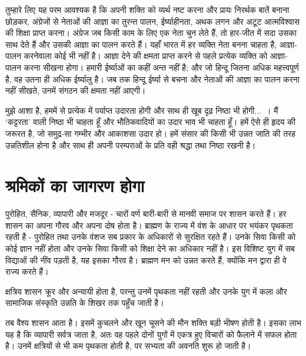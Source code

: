 तुम्हारे लिए यह परम आवश्यक है कि अपनी शक्ति को व्यर्थ नष्ट करना और प्रायः निरर्थक बातें बनाना छोड़कर, अंग्रेजों से नेताओं की आज्ञा का तुरन्त पालन, ईर्ष्याहीनता, अथक लगन और अटूट आत्मविश्वास की शिक्षा प्राप्त करना। अंग्रेज जब किसी काम के लिए एक नेता चुन लेते हैं, तो हार-जीत में सदा उसका साथ देते हैं और उसकी आज्ञा का पालन करते हैं। यहाँ भारत में हर व्यक्ति नेता बनना चाहता है, आज्ञा-पालन करनेवाला कोई भी नहीं है। आज्ञा देने की क्षमता प्राप्त करने से पहले प्रत्येक व्यक्ति को आज्ञा-पालन करना सीखना होगा। हमारी ईर्ष्याओं का कहीं अन्त नहीं है; और जो हिन्दू जितना अधिक महत्त्वपूर्ण है, वह उतना ही अधिक ईर्ष्यालु है। जब तक हिन्दू ईर्ष्या से बचना और नेताओं की आज्ञा का पालन करना नहीं सीखते, उनमें संगठन की क्षमता नहीं आएगी। 

\vskip 2pt

मुझे आशा है, हममें से प्रत्येक में पर्याप्त उदारता होगी और साथ ही खूब दृढ़ निष्ठा भी होगी...~। मैं ‘कट्टरता’ वाली निष्ठा भी चाहता हूँ और भौतिकवादियों का उदार भाव भी चाहता हूँ। हमें ऐसे ही हृदय की जरूरत है, जो समुद्र-सा गम्भीर और आकाशसा उदार हो। हमें संसार की किसी भी उन्नत जाति की तरह उन्नतिशील होना है और साथ ही अपनी परम्पराओं के प्रति वही श्रद्धा तथा निष्ठा रखनी है।


\section*{श्रमिकों का जागरण होगा}


पुरोहित, सैनिक, व्यापारी और मजदूर - चारों वर्ण बारी-बारी से मानवी समाज पर शासन करते हैं। हर शासन का अपना गौरव और अपना दोष होता है। ब्राह्मण के राज्य में वंश के आधार पर भयंकर पृथकता रहती है - पुरोहित तथा उनके वंशज सब प्रकार के अधिकारों से सुरक्षित रहते हैं। उनके सिवा किसी को कोई ज्ञान नहीं होता और उनके सिवा किसी को शिक्षा देने का अधिकार नहीं है। इस विशिष्ट युग में सब विद्याओं की नींव पड़ती है, यह इसका गौरव है। ब्राह्मण मन को उन्नत करते हैं, क्योंकि मन द्वारा ही वे राज्य करते हैं। 

\vskip 2pt

क्षत्रिय शासन क्रूर और अन्यायी होता है, परन्तु उनमें पृथकता नहीं रहती और उनके युग में कला और सामाजिक संस्कृति उन्नति के शिखर तक पहुँच जाती है। 

\vskip 2pt

तब वैश्य शासन आता है। इसमें कुचलने और खून चूसने की मौन शक्ति बड़ी भीषण होती है। इसका लाभ यह है कि व्यापारी सर्वत्र जाता है, अतः वह पहले दोनों युगों में एकत्र हुए विचारों को फैलाने में सफल होता है। उनमें क्षत्रियों से भी कम पृथकता होती है, पर सभ्यता की अवनति शुरू हो जाती है। 

